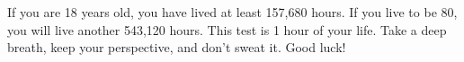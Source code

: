 
If you are 18 years old, you have lived at least 157,680 hours. If you live to be 80, you will live another 543,120 hours. This test is 1 hour of your life. Take a deep breath, keep your perspective, and don't sweat it. Good luck! 
